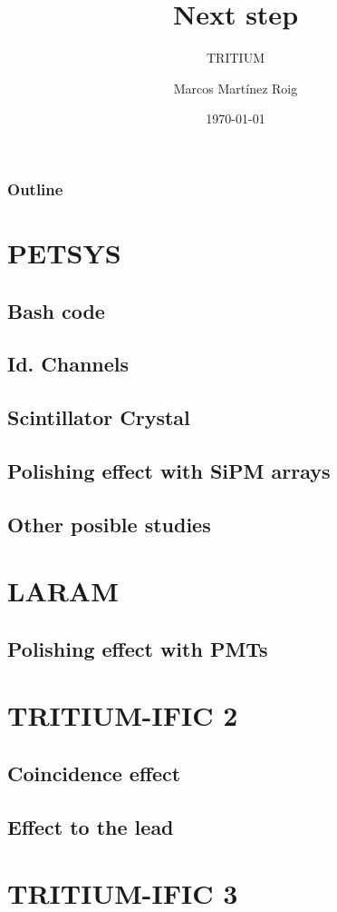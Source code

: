 \documentclass{beamer}
\title{Next step}
\subtitle{TRITIUM}
\author{Marcos Martínez Roig}
\institute{University of Valencia}
\date{\today}
\begin{document}
\begin{frame}
\titlepage
\end{frame}

\begin{frame}
\frametitle{Outline}
\tableofcontents
\end{frame}

\section{PETSYS}
	\subsection{Bash code}
	\subsection{Id. Channels}
	\subsection{Scintillator Crystal}
	\subsection{Polishing effect with SiPM arrays}
	\subsection{Other posible studies}

\section{LARAM}
	\subsection{Polishing effect with PMTs}
	
\section{TRITIUM-IFIC 2}
	\subsection{Coincidence effect}
	\subsection{Effect to the lead}
	
\section{TRITIUM-IFIC 3}
\end{document}
